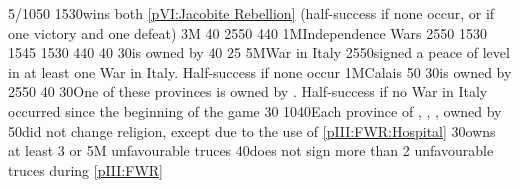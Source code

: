 %
%
{5/10}{50}{}%
%
%
{15}{30}{\paysmajeurAngleterre wins both \ref{pVI:Jacobite Rebellion}
  (half-success if none occur, or if one victory and one defeat)}%
%
\EUobjective3M{}{}%
{}{40}{}%
%
%
{25}{50}{\EU@objWoSS}%
%
%
{4}{40}{\EU@objEastIndiesConvoy}%
%
%
\EUobjective1M{Independence Wars}{}%
{25}{50}{\EU@objIndependanceWars}%
%
%
{15}{30}{\EU@objFranceContained}%
%
%
{15}{45}{\EU@objEachCC}%
%
%
{15}{30}{\EU@objSYW}
%
%
{4}{40}{\EU@objEastIndiesConvoy}%
%
%
%
 
%
%
{}{40}{\EU@objCalaisFRA}%
%
%
%
{}{30}{\provinceArtois is owned by \paysmajeurFrance}%
%
%
{}{40}{\EU@objSDCF}%
%
%
{}{25}{\EU@objIndustrial}%
%
%
\EUobjective5M{War in Italy}{}%
{25}{50}{\paysmajeurFrance signed a peace of level  in at least one War
  in Italy. Half-success if none occur}%
%
%
\EUobjective1M{Calais}{}%
{}{50}{\EU@objCalaisFRA}%
%
%
{}{30}{\provinceArtois is owned by \paysmajeurFrance}%
%
%
{25}{50}{}%
%
%
{}{40}{\EU@objIndustrial}%
%
%
{}{30}{One of these provinces is owned by \paysmajeurFrance. Half-success if
  no War in Italy occurred since the beginning of the game}%
%
%
%
{}{30}{}%
%
%
%
{10}{40}{Each province of \provinceArtois, \provinceBresse,
  , \provinceRoussillon owned by \paysmajeurFrance}%
%
%
%
{}{50}{\paysmajeurFrance did not change religion, except due to the use of
  \ref{pIII:FWR:Hospital}}%
%
%
%
{}{30}{\paysmajeurFrance owns at least 3 \COL or \TP}%
%
%
\EUobjective5M{ unfavourable truces}{}%
{}{40}{\paysmajeurFrance does not sign more than 2 unfavourable truces during
  \ref{pIII:FWR}}%
%
